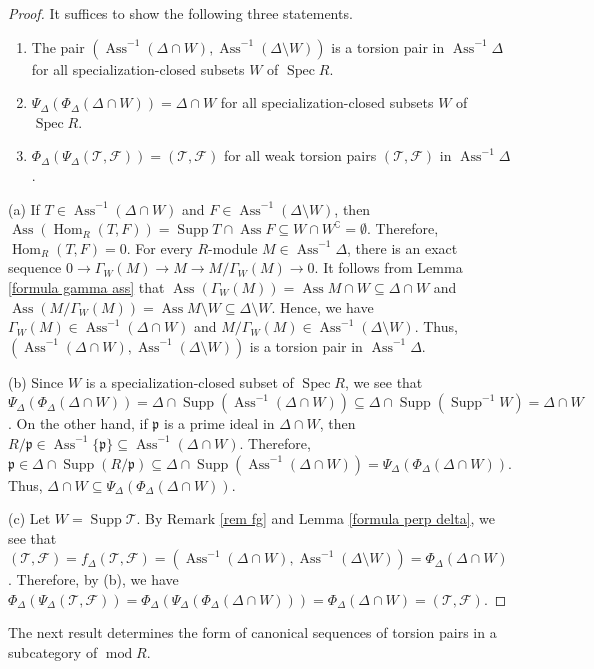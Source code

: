 \documentclass{amsart}
\theoremstyle{definition}
\theoremstyle{remark}
\def\Ass{\operatorname{Ass}}
\def\F{\mathcal{F}}
\def\Hom{\operatorname{Hom}}
\def\mod{\operatorname{mod}}
\def\p{\mathfrak{p}}
\def\Spec{\operatorname{Spec}}
\def\Supp{\operatorname{Supp}}
\def\T{\mathcal{T}}
\begin{document}
\begin{proof}
It suffices to show the following three statements.
\begin{enumerate}[\rm(a)]
\item 
The pair $(\Ass^{-1}(\Delta\cap W),\Ass^{-1}(\Delta\setminus W))$ is a torsion pair in $\Ass^{-1}\Delta$ for all specialization-closed subsets $W$ of $\Spec R$.
\item 
$\Psi_\Delta(\Phi_\Delta(\Delta\cap W))=\Delta\cap W$ for all specialization-closed subsets $W$ of $\Spec R$.
\item 
$\Phi_\Delta(\Psi_\Delta(\T,\F))=(\T,\F)$ for all weak torsion pairs $(\T,\F)$ in $\Ass^{-1}\Delta$.
\end{enumerate}

(a) If $T\in\Ass^{-1}(\Delta\cap W)$ and $F\in\Ass^{-1}(\Delta\setminus W)$, then $\Ass(\Hom_R(T,F))=\Supp T\cap\Ass F\subseteq W\cap W^\complement =\emptyset$. Therefore, $\Hom_R(T,F)=0$. For every $R$-module $M\in\Ass^{-1}\Delta$, there is an exact sequence $0\to\Gamma_W(M)\to M\to M/\Gamma_W(M)\to0$. It follows from Lemma \ref{formula gamma ass} that $\Ass(\Gamma_W(M))=\Ass M\cap W\subseteq\Delta\cap W$ and $\Ass(M/\Gamma_W(M))=\Ass M\setminus W\subseteq\Delta\setminus W$. Hence, we have $\Gamma_W(M)\in\Ass^{-1}(\Delta\cap W)$ and $M/\Gamma_W(M)\in\Ass^{-1}(\Delta\setminus W)$. Thus, $(\Ass^{-1}(\Delta\cap W),\Ass^{-1}(\Delta\setminus W))$ is a torsion pair in $\Ass^{-1}\Delta$.

(b) Since $W$ is a specialization-closed subset of $\Spec R$, we see that $\Psi_\Delta(\Phi_\Delta(\Delta\cap W))=\Delta\cap\Supp(\Ass^{-1}(\Delta\cap W))\subseteq\Delta\cap\Supp(\Supp^{-1}W)=\Delta\cap W$. On the other hand, if $\p$ is a prime ideal in $\Delta\cap W$, then $R/\p\in\Ass^{-1}\{\p\}\subseteq\Ass^{-1}(\Delta\cap W)$. Therefore, $\p\in\Delta\cap\Supp(R/\p)\subseteq\Delta\cap\Supp(\Ass^{-1}(\Delta\cap W))=\Psi_\Delta(\Phi_\Delta(\Delta\cap W))$. Thus, $\Delta\cap W\subseteq \Psi_\Delta(\Phi_\Delta(\Delta\cap W))$.

(c) Let $W=\Supp\T$. By Remark \ref{rem fg} and Lemma \ref{formula perp delta}, we see that $(\T,\F)=f_\Delta(\T,\F)=(\Ass^{-1}(\Delta\cap W),\Ass^{-1}(\Delta\setminus W))=\Phi_\Delta(\Delta\cap W)$. Therefore, by (b), we have $\Phi_\Delta(\Psi_\Delta(\T,\F))=\Phi_\Delta(\Psi_\Delta(\Phi_\Delta(\Delta\cap W)))=\Phi_\Delta(\Delta\cap W)=(\T,\F)$.
\end{proof}

The next result determines the form of canonical sequences of torsion pairs in a subcategory of $\mod R$.
\end{document}

